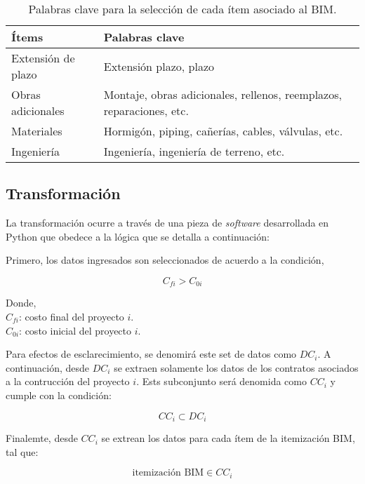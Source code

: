 \begin{table}[H]
    \centering
    \caption{Palabras clave para la selección de cada ítem asociado al BIM.}
    \label{tab.keyw}
    \begin{tabular}{ll}
        \toprule
        \textbf{Ítems}      & \textbf{Palabras clave} \\
        \midrule
        Extensión de plazo  & Extensión plazo, plazo\\
        Obras adicionales   & Montaje, obras adicionales, rellenos, reemplazos, reparaciones, etc.\\
        Materiales          & Hormigón, piping, cañerías, cables, válvulas, etc. \\
        Ingeniería          & Ingeniería, ingeniería de terreno, etc. \\
        \bottomrule
    \end{tabular}
\end{table}

\subsection{Transformación}

La transformación ocurre a través de una pieza de \emph{software} desarrollada en Python que obedece a la lógica que se detalla a continuación:

Primero, los datos ingresados son seleccionados de acuerdo a la condición,

\begin{equation}
    C_{fi} > C_{0i}
\end{equation}

\noindent
Donde,\\
$C_{fi}$: costo final del proyecto $i$.\\
$C_{0i}$: costo inicial del proyecto $i$.

Para efectos de esclarecimiento, se denomirá este set de datos como $DC_i$. A continuación, desde $DC_i$ se extraen solamente los datos de los contratos asociados a la contrucción del proyecto $i$. Ests subconjunto será denomida como $CC_i$ y cumple con la condición:

\begin{equation}
    CC_i \subset DC_i
\end{equation}

Finalemte, desde $CC_i$ se extrean los datos para cada ítem de la itemización BIM, tal que:

\begin{equation}
    \text{itemización BIM} \in CC_i
\end{equation}

